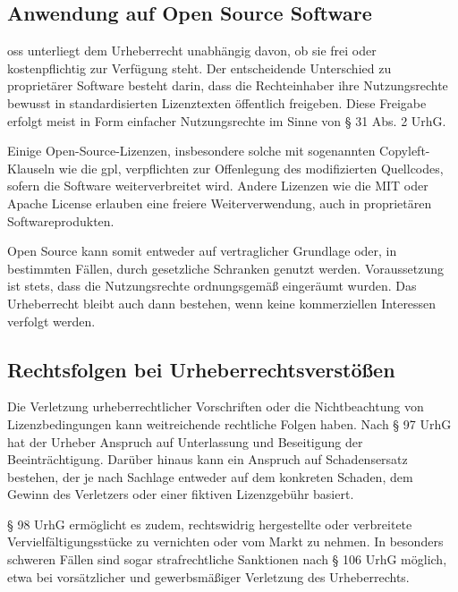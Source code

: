 \subsection{Anwendung auf Open Source Software}

\gls{oss} unterliegt dem Urheberrecht unabhängig davon, ob sie frei oder kostenpflichtig zur Verfügung steht.
Der entscheidende Unterschied zu proprietärer Software besteht darin, dass die Rechteinhaber ihre Nutzungsrechte bewusst in standardisierten Lizenztexten öffentlich freigeben.
Diese Freigabe erfolgt meist in Form einfacher Nutzungsrechte im Sinne von § 31 Abs. 2 UrhG.

Einige Open-Source-Lizenzen, insbesondere solche mit sogenannten Copyleft-Klauseln wie die \gls{gpl}, verpflichten zur Offenlegung des modifizierten Quellcodes, sofern die Software weiterverbreitet wird.
Andere Lizenzen wie die MIT oder Apache License erlauben eine freiere Weiterverwendung, auch in proprietären Softwareprodukten.

Open Source kann somit entweder auf vertraglicher Grundlage oder, in bestimmten Fällen, durch gesetzliche Schranken genutzt werden.
Voraussetzung ist stets, dass die Nutzungsrechte ordnungsgemäß eingeräumt wurden.
Das Urheberrecht bleibt auch dann bestehen, wenn keine kommerziellen Interessen verfolgt werden.


\subsection{Rechtsfolgen bei Urheberrechtsverstößen}

Die Verletzung urheberrechtlicher Vorschriften oder die Nichtbeachtung von Lizenzbedingungen kann weitreichende rechtliche Folgen haben.
Nach § 97 UrhG hat der Urheber Anspruch auf Unterlassung und Beseitigung der Beeinträchtigung.
Darüber hinaus kann ein Anspruch auf Schadensersatz bestehen, der je nach Sachlage entweder auf dem konkreten Schaden, dem Gewinn des Verletzers oder einer fiktiven Lizenzgebühr basiert.

§ 98 UrhG ermöglicht es zudem, rechtswidrig hergestellte oder verbreitete Vervielfältigungsstücke zu vernichten oder vom Markt zu nehmen.
In besonders schweren Fällen sind sogar strafrechtliche Sanktionen nach § 106 UrhG möglich, etwa bei vorsätzlicher und gewerbsmäßiger Verletzung des Urheberrechts.

